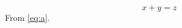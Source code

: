 \documentclass{article}
\begin{document}
\begin{equation}\label{eq:a} x + y = z \end{equation}
From \eqref{eq:a}.
\end{document}
